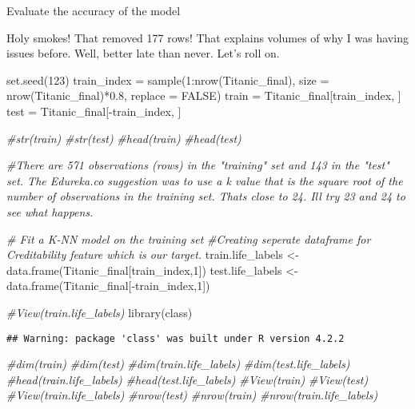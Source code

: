 \documentclass[
  ignorenonframetext,
]{beamer}
\newenvironment{Shaded}{\begin{snugshade}}{\end{snugshade}}
\newcommand{\AttributeTok}[1]{\textcolor[rgb]{0.77,0.63,0.00}{#1}}
\newcommand{\CommentTok}[1]{\textcolor[rgb]{0.56,0.35,0.01}{\textit{#1}}}
\newcommand{\ConstantTok}[1]{\textcolor[rgb]{0.00,0.00,0.00}{#1}}
\newcommand{\DecValTok}[1]{\textcolor[rgb]{0.00,0.00,0.81}{#1}}
\newcommand{\FloatTok}[1]{\textcolor[rgb]{0.00,0.00,0.81}{#1}}
\newcommand{\FunctionTok}[1]{\textcolor[rgb]{0.00,0.00,0.00}{#1}}
\newcommand{\NormalTok}[1]{#1}
\newcommand{\OtherTok}[1]{\textcolor[rgb]{0.56,0.35,0.01}{#1}}
\newcommand{\SpecialCharTok}[1]{\textcolor[rgb]{0.00,0.00,0.00}{#1}}
\begin{document}
\begin{frame}[fragile]{Evaluate the accuracy of the model}
\begin{block}{Holy smokes! That removed 177 rows! That explains volumes
of why I was having issues before. Well, better late than never. Let's
roll on.}
\begin{Shaded}
\begin{Highlighting}[]
\FunctionTok{set.seed}\NormalTok{(}\DecValTok{123}\NormalTok{)}
\NormalTok{train\_index }\OtherTok{=} \FunctionTok{sample}\NormalTok{(}\DecValTok{1}\SpecialCharTok{:}\FunctionTok{nrow}\NormalTok{(Titanic\_final), }\AttributeTok{size =} \FunctionTok{nrow}\NormalTok{(Titanic\_final)}\SpecialCharTok{*}\FloatTok{0.8}\NormalTok{, }\AttributeTok{replace =} \ConstantTok{FALSE}\NormalTok{)}
\NormalTok{train }\OtherTok{=}\NormalTok{ Titanic\_final[train\_index, ]}
\NormalTok{test }\OtherTok{=}\NormalTok{ Titanic\_final[}\SpecialCharTok{{-}}\NormalTok{train\_index, ]}

\CommentTok{\#str(train)}
\CommentTok{\#str(test)}
\CommentTok{\#head(train)}
\CommentTok{\#head(test)}

\CommentTok{\#There are 571 observations (rows) in the "training" set and 143 in the "test" set.  The Edureka.co suggestion was to use a k value that is the square root of the number of observations in the training set.  That\textquotesingle{}s close to 24.  I\textquotesingle{}ll try 23 and 24 to see what happens.  }

\CommentTok{\# Fit a K{-}NN model on the training set}
\CommentTok{\#Creating seperate dataframe for \textquotesingle{}Creditability\textquotesingle{} feature which is our target.}
\NormalTok{train.life\_labels }\OtherTok{\textless{}{-}} \FunctionTok{data.frame}\NormalTok{(Titanic\_final[train\_index,}\DecValTok{1}\NormalTok{])}
\NormalTok{test.life\_labels }\OtherTok{\textless{}{-}} \FunctionTok{data.frame}\NormalTok{(Titanic\_final[}\SpecialCharTok{{-}}\NormalTok{train\_index,}\DecValTok{1}\NormalTok{])}




\CommentTok{\#View(train.life\_labels)}
\FunctionTok{library}\NormalTok{(class)}
\end{Highlighting}
\end{Shaded}

\begin{verbatim}
## Warning: package 'class' was built under R version 4.2.2
\end{verbatim}

\begin{Shaded}
\begin{Highlighting}[]
\CommentTok{\#dim(train)}
\CommentTok{\#dim(test)}
\CommentTok{\#dim(train.life\_labels)}
\CommentTok{\#dim(test.life\_labels)}
\CommentTok{\#head(train.life\_labels)}
\CommentTok{\#head(test.life\_labels)}
\CommentTok{\#View(train)}
\CommentTok{\#View(test)}
\CommentTok{\#View(train.life\_labels)}
\CommentTok{\#nrow(test)}
\CommentTok{\#nrow(train)}
\CommentTok{\#nrow(train.life\_labels)}


\end{Highlighting}
\end{Shaded}
\end{block}
\end{frame}
\end{document}
